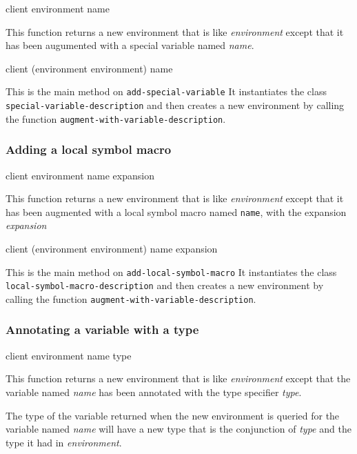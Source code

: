 {\footnotesize
{} {client environment name}
}

This function returns a new environment that is like
\textit{environment} except that it has been augumented with a special
variable named \textit{name}.

{\footnotesize
{}
{client
 (environment environment)
 name}
}

This is the main method on \texttt{add-special-variable} It
instantiates the class \texttt{special-variable-description} and then
creates a new environment by calling the function
\texttt{augment-with-variable-description}.


\subsubsection{Adding a local symbol macro}

{\footnotesize
{} {client environment name expansion}
}

This function returns a new environment that is like
\textit{environment} except that it has been augmented with a local
symbol macro named \texttt{name}, with the expansion
\textit{expansion}

{\footnotesize
{}
{client
 (environment environment)
 name
 expansion}
}

This is the main method on \texttt{add-local-symbol-macro} It
instantiates the class \texttt{local-symbol-macro-description} and then
creates a new environment by calling the function
\texttt{augment-with-variable-description}.

\subsubsection{Annotating a variable with a type}
\label{sec-annotating-a-variable-with-a-type}

{\footnotesize
{} {client environment name type}
}

This function returns a new environment that is like
\textit{environment} except that the variable named \textit{name} has
been annotated with the type specifier \textit{type}.

The type of the variable returned when the new environment is queried
for the variable named \textit{name} will have a new type that is the
conjunction of \textit{type} and the type it had in
\textit{environment}.


